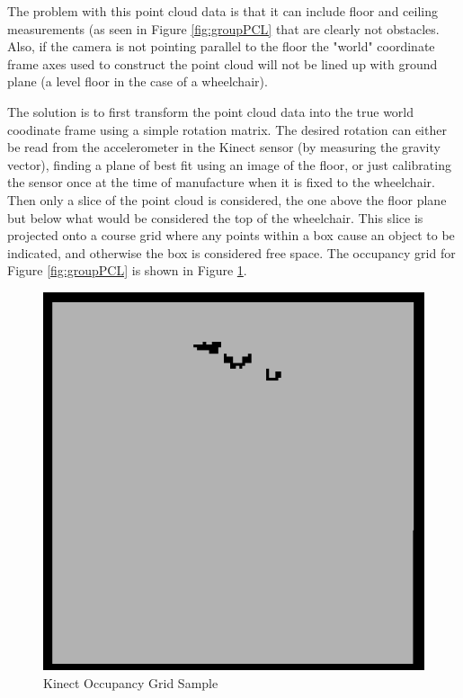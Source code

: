 \documentclass[oneside,final,a4paper]{report}
\begin{document}
The problem with this point cloud data is that it can include floor and ceiling measurements (as seen in Figure \ref{fig:groupPCL} that are clearly not obstacles. Also, if the camera is not pointing parallel to the floor the "world" coordinate frame axes used to construct the point cloud will not be lined up with ground plane (a level floor in the case of a wheelchair).

The solution is to first transform the point cloud data into the true world coodinate frame using a simple rotation matrix. The desired rotation can either be read from the accelerometer in the Kinect sensor (by measuring the gravity vector), finding a plane of best fit using an image of the floor, or just calibrating the sensor once at the time of manufacture when it is fixed to the wheelchair. Then only a slice of the point cloud is considered, the one above the floor plane but below what would be considered the top of the wheelchair. This slice is projected onto a course grid where any points within a box cause an object to be indicated, and otherwise the box is considered free space. The occupancy grid for Figure \ref{fig:groupPCL} is shown in Figure \ref{fig:groupOccupancy}.

\begin{figure}[hbt]
 \centering
 \includegraphics[scale=0.35]{group_occupancy}
 \caption{Kinect Occupancy Grid Sample} \label{fig:groupOccupancy}
\end{figure}
\end{document}
